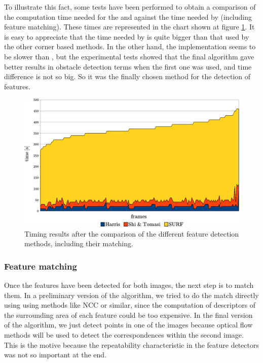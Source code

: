 To illustrate this fact, some tests have been performed to obtain a comparison of the computation time needed for the \cite{harris1988combined} and \cite{shi1994good} against the time needed by \cite{bay2008speeded} (including feature matching). These times are represented in the chart shown at figure \ref{fig:cp01_features_time_comparison}. It is easy to appreciate that the time needed by \cite{bay2008speeded} is quite bigger than that used by the other corner based methods. In the other hand, the \cite{shi1994good} implementation seems to be slower than \cite{harris1988combined}, but the experimental tests showed that the final algorithm gave better results in obstacle detection terms when the first one was used, and time difference is not so big. So it was the finally chosen method for the detection of features.

\begin{figure}[h!]
\centering
\includegraphics{featuresTimeComparison}
\caption{Timing results after the comparison of the different feature detection methods, including their matching.}\label{fig:cp01_features_time_comparison}
\end{figure}

\subsubsection{Feature matching}\label{ch:chapter01_01_02_02}

Once the features have been detected for both images, the next step is to match them. In a preliminary version of the algorithm, we tried to do the match directly using using methods like \acf{NCC} or similar, since the computation of descriptors of the surrounding area of each feature could be too expensive. In the final version of the algorithm, we just detect points in one of the images because optical flow methods will be used to detect the correspondences within the second image. This is the motive because the repeatability characteristic in the feature detectors was not so important at the end.


